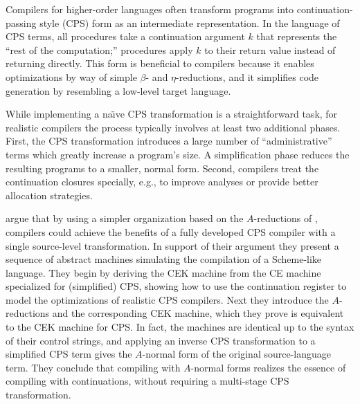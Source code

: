 \documentclass[11pt]{article}
\begin{document}
\thispagestyle{fancy}

Compilers for higher-order languages often transform programs into
continuation-passing style (CPS) form as an intermediate representation. In the
language of CPS terms, all procedures take a continuation argument $k$
that represents the ``rest of the computation;'' procedures apply $k$ to their
return value instead of returning directly. This form is beneficial to
compilers because it enables optimizations by way of simple $\beta$- and
$\eta$-reductions, and it simplifies code generation by resembling a low-level
target language.


While implementing a na\"{\i}ve CPS transformation is a straightforward task,
for realistic compilers the process typically involves at least two additional
phases. First, the CPS transformation introduces a large number of
``administrative'' terms which greatly increase a program's size.
A simplification phase reduces the resulting programs to a smaller, normal
form. Second, compilers treat the continuation closures specially, e.g., to
improve analyses or provide better allocation strategies.

\citet{Flanagan:1993fk} argue that by using a simpler organization based on
the $A$-reductions of \citet{Sabry:1992zr}, compilers could achieve the 
benefits of a fully developed CPS compiler with a single source-level
transformation. In support of their argument they present a sequence of
abstract machines simulating the compilation of a Scheme-like language.
They begin by deriving the CEK machine from the CE machine specialized for
(simplified) CPS, showing how to use the continuation register to model the
optimizations of realistic CPS compilers. Next they introduce the
$A$-reductions and the corresponding CEK machine, which they prove is
equivalent to the CEK machine for CPS. In fact, the machines are identical
up to the syntax of their control strings, and applying an inverse CPS
transformation to a simplified CPS term gives the $A$-normal form of the
original source-language term. They conclude that compiling with $A$-normal
forms realizes the essence of compiling with continuations, without requiring
a multi-stage CPS transformation.
\end{document}
